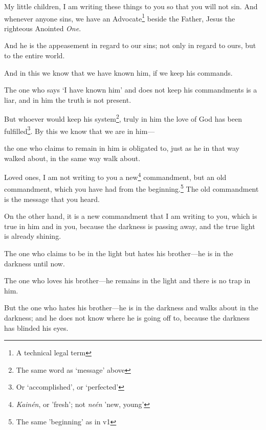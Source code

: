 \documentclass[article]{memoir}%
\newcounter{vnum}
\renewcommand*{\chapter}{
	\vspace{\baselineskip}
	\settowidth{\chapindent}{\chapnumfont 999}
	\noindent\llap{\makebox[\chapindent][l]{%
		\chapnumfont \thechapter}}%
	\addtocounter{chapter}{1}
	\setcounter{vnum}{1}
}
\newcommand{\vnum}{%
	\textsuperscript{\thevnum}%
	\addtocounter{vnum}{1}%
}
\newcommand{\infer}[1]{\textit{#1}}
\newcommand{\focus}[1]{{#1}}
\newcommand{\lx}[1]{\textit{#1}}
\begin{document}
\chapter {} \vnum My little children, I am writing these things to you so that you will not sin. And whenever anyone sins, we have an Advocate\footnote{A technical legal term} beside the Father, Jesus the righteous Anointed \infer{One}. \vnum And he is the appeasement in regard to our sins; not only in regard to ours, but to the entire world. \vnum And in this we know that we have known him, if we keep his commands. \vnum The one who says `I have known him' and does not keep his commandments is a liar, and in him the truth is not present. \vnum But whoever would keep his system\footnote{The same word as `message' above}, truly in him the love of God	 has been fulfilled\footnote{Or `accomplished', or `perfected'}. By this we know that we \focus{are} in him---\vnum{}the one who claims to remain in him is obligated to, just as he in that way walked about, in the same way walk about.

\vnum Loved ones, I am not writing to you a new\footnote{\lx{Kainén}, or 'fresh'; not \textit{neén} 'new, young'} commandment, but an old commandment, which you have had from the beginning.\footnote{The same 'beginning' as in v1} The old commandment is the message that you heard. \vnum On the other hand, it is a new commandment that I am writing to you, which is true in him and in you, because the darkness is passing away, and the true light is already shining. \vnum The one who claims to be in the light but hates his brother---he is in the darkness until now. \vnum The one who loves his brother---he remains in the light and there is no trap in him. \vnum But the one who hates his brother---he is in the darkness and walks about in the darkness; and he does not know where he is going off to, because the darkness has blinded his eyes.
\end{document}
